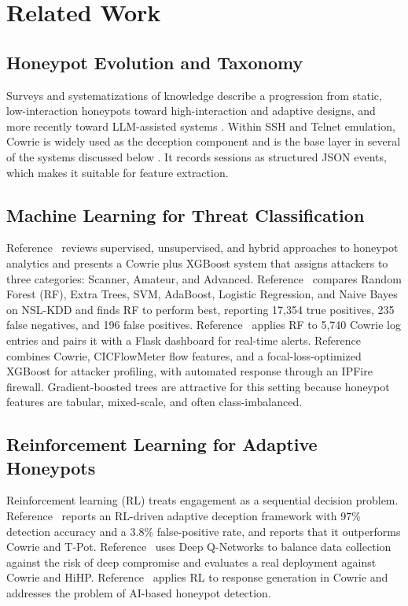 \documentclass[conference]{IEEEtran}
\begin{document}
\section{Related Work}\label{sec:related}
\subsection{Honeypot Evolution and Taxonomy}
Surveys and systematizations of knowledge describe a progression from static, low-interaction honeypots toward high-interaction and adaptive designs, and more recently toward LLM-assisted systems \cite{ref1,ref12}. Within SSH and Telnet emulation, Cowrie \cite{ref16} is widely used as the deception component and is the base layer in several of the systems discussed below \cite{ref1,ref2,ref5}. It records sessions as structured JSON events, which makes it suitable for feature extraction.

\subsection{Machine Learning for Threat Classification}
Reference~\cite{ref1} reviews supervised, unsupervised, and hybrid approaches to honeypot analytics and presents a Cowrie plus XGBoost system that assigns attackers to three categories: Scanner, Amateur, and Advanced. Reference~\cite{ref4} compares Random Forest (RF), Extra Trees, SVM, AdaBoost, Logistic Regression, and Naive Bayes on NSL-KDD \cite{ref14} and finds RF to perform best, reporting 17,354 true positives, 235 false negatives, and 196 false positives. Reference~\cite{ref5} applies RF to 5,740 Cowrie log entries and pairs it with a Flask dashboard for real-time alerts. Reference~\cite{ref2} combines Cowrie, CICFlowMeter flow features, and a focal-loss-optimized XGBoost for attacker profiling, with automated response through an IPFire firewall. Gradient-boosted trees \cite{ref13} are attractive for this setting because honeypot features are tabular, mixed-scale, and often class-imbalanced.

\subsection{Reinforcement Learning for Adaptive Honeypots}
Reinforcement learning (RL) treats engagement as a sequential decision problem. Reference~\cite{ref3} reports an RL-driven adaptive deception framework with 97\% detection accuracy and a 3.8\% false-positive rate, and reports that it outperforms Cowrie and T-Pot. Reference~\cite{ref7} uses Deep Q-Networks to balance data collection against the risk of deep compromise and evaluates a real deployment against Cowrie and HiHP. Reference~\cite{ref8} applies RL to response generation in Cowrie and addresses the problem of AI-based honeypot detection.
\end{document}
